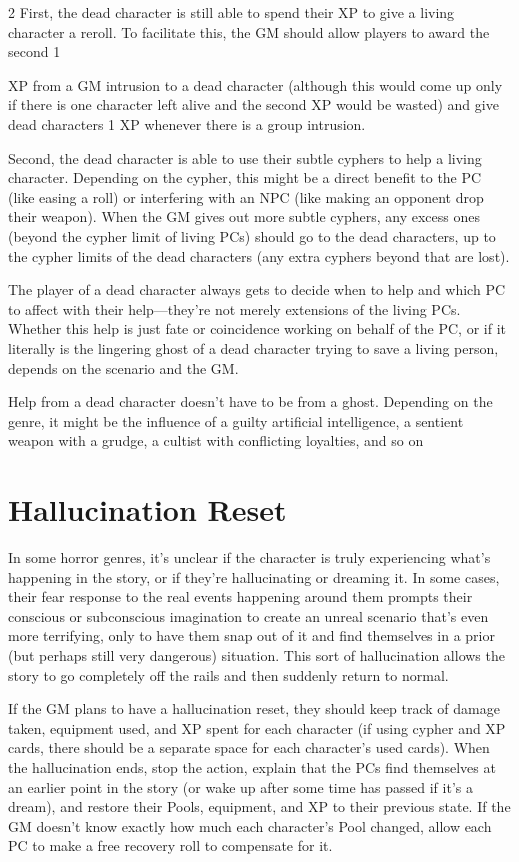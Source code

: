 \begin{multicols}{2}
First, the dead character is still able to spend their XP to give a living character a reroll. To facilitate this, the GM should allow players to award the second 1

XP from a GM intrusion to a dead character (although this would come up only if there is one character left alive and the second XP would be wasted) and give dead characters 1 XP whenever there is a group intrusion.

Second, the dead character is able to use their subtle cyphers to help a living character. Depending on the cypher, this might be a direct benefit to the PC (like easing a roll) or interfering with an NPC (like making an opponent drop their weapon). When the GM gives out more subtle cyphers, any excess ones (beyond the cypher limit of living PCs) should go to the dead characters, up to the cypher limits of the dead characters (any extra cyphers beyond that are lost).

The player of a dead character always gets to decide when to help and which PC to affect with their help—they’re not merely extensions of the living PCs. Whether this help is just fate or coincidence working on behalf of the PC, or if it literally is the lingering ghost of a dead character trying to save a living person, depends on the scenario and the GM.

Help from a dead character doesn’t have to be from a ghost. Depending on the genre, it might be the influence of a guilty artificial intelligence, a sentient weapon with a grudge, a cultist with conflicting loyalties, and so on

\section{Hallucination Reset}

In some horror genres, it’s unclear if the character is truly experiencing what’s happening in the story, or if they’re hallucinating or dreaming it. In some cases, their fear response to the real events happening around them prompts their conscious or subconscious imagination to create an unreal scenario that’s even more terrifying, only to have them snap out of it and find themselves in a prior (but perhaps still very dangerous) situation. This sort of hallucination allows the story to go completely off the rails and then suddenly return to normal.

If the GM plans to have a hallucination reset, they should keep track of damage taken, equipment used, and XP spent for each character (if using cypher and XP cards, there should be a separate space for each character’s used cards). When the hallucination ends, stop the action, explain that the PCs find themselves at an earlier point in the story (or wake up after some time has passed if it’s a dream), and restore their Pools, equipment, and XP to their previous state. If the GM doesn’t know exactly how much each character’s Pool changed, allow each PC to make a free recovery roll to compensate for it.


\end{multicols}
